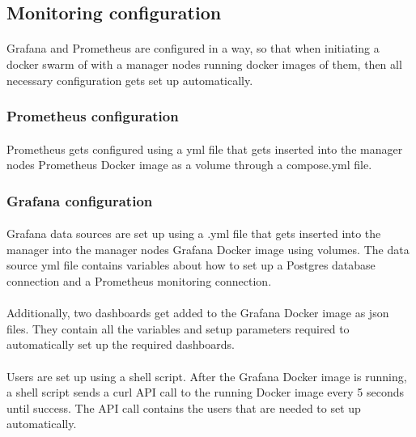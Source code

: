 \subsection{Monitoring configuration}
\paragraph{} Grafana and Prometheus are configured in a way, so that when initiating a docker swarm of with a manager nodes running docker images of them, then all necessary configuration gets set up automatically.

\subsubsection{Prometheus configuration}
\paragraph{} Prometheus gets configured using a yml file that gets inserted into the manager nodes Prometheus Docker image as a volume through a compose.yml file.

\subsubsection{Grafana configuration}
\paragraph{} Grafana data sources are set up using a .yml file that gets inserted into the manager into the manager nodes Grafana Docker image using volumes. The data source yml file contains variables about how to set up a Postgres database connection and a Prometheus monitoring connection.
\paragraph{} Additionally, two dashboards get added to the Grafana Docker image as json files. They contain all the variables and setup parameters required to automatically set up the required dashboards.
\paragraph{} Users are set up using a shell script. After the Grafana Docker image is running, a shell script sends a curl API call to the running Docker image every 5 seconds until success. The API call contains the users that are needed to set up automatically.